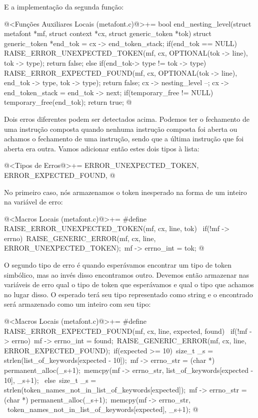 E a implementação da segunda função:

\iniciocodigo
@<Funções Auxiliares Locais (metafont.c)@>+=
bool end_nesting_level(struct metafont *mf, struct context *cx,
                       struct generic_token *tok){
  struct generic_token *end_tok = cx -> end_token_stack;
  if(end_tok == NULL){
    RAISE_ERROR_UNEXPECTED_TOKEN(mf, cx, OPTIONAL(tok -> line), tok -> type);
    return false;
  }
  else if(end_tok-> type != tok -> type){
    RAISE_ERROR_EXPECTED_FOUND(mf, cx, OPTIONAL(tok -> line),
                               end_tok -> type, tok -> type);
    return false;
  }
  cx -> nesting_level --;
  cx -> end_token_stack = end_tok -> next;
  if(temporary_free != NULL)
    temporary_free(end_tok);
  return true;
}
@
\fimcodigo

Dois erros diferentes podem ser detectados acima. Podemos ter o
fechamento de uma instrução composta quando nenhuma instrução composta
foi aberta ou achamos o fechamento de uma instrução, sendo que a
última instrução que foi aberta era outra. Vamos adicionar então estes
dois tipos à lista:

\iniciocodigo
@<Tipos de Erros@>+=
ERROR_UNEXPECTED_TOKEN, ERROR_EXPECTED_FOUND,
@
\fimcodigo

No primeiro caso, nós armazenamos o token inesperado na forma de um
inteiro na variável de erro:

\iniciocodigo
@<Macros Locais (metafont.c)@>+=
#define RAISE_ERROR_UNEXPECTED_TOKEN(mf, cx, line, tok) {\
  if(!mf -> errno){\
    RAISE_GENERIC_ERROR(mf, cx, line, ERROR_UNEXPECTED_TOKEN);\
    mf -> errno_int = tok;}}
@
\fimcodigo

O segundo tipo de erro é quando esperávamos encontrar um tipo de token
simbólico, mas ao invés disso encontramos outro. Devemos então
armazenar nas variáveis de erro qual o tipo de token que esperávamos e
qual o tipo que achamos no lugar disso. O esperado terá seu tipo
representado como string e o encontrado será armazenado como um
inteiro com seu tipo:

\iniciocodigo
@<Macros Locais (metafont.c)@>+=
#define RAISE_ERROR_EXPECTED_FOUND(mf, cx, line, expected, found) {\
  if(!mf -> errno){\
    mf -> errno_int = found;\
    RAISE_GENERIC_ERROR(mf, cx, line, ERROR_EXPECTED_FOUND);\
    if(expected >= 10){\
      size_t _s = strlen(list_of_keywords[expected - 10]);\
      mf -> errno_str = (char *) permanent_alloc(_s+1);\
      memcpy(mf -> errno_str, list_of_keywords[expected - 10], _s+1);\
    } else{\
      size_t _s = strlen(token_names_not_in_list_of_keywords[expected]);\
      mf -> errno_str = (char *) permanent_alloc(_s+1);\
      memcpy(mf -> errno_str, \
             token_names_not_in_list_of_keywords[expected], _s+1);}}}
@
\fimcodigo

